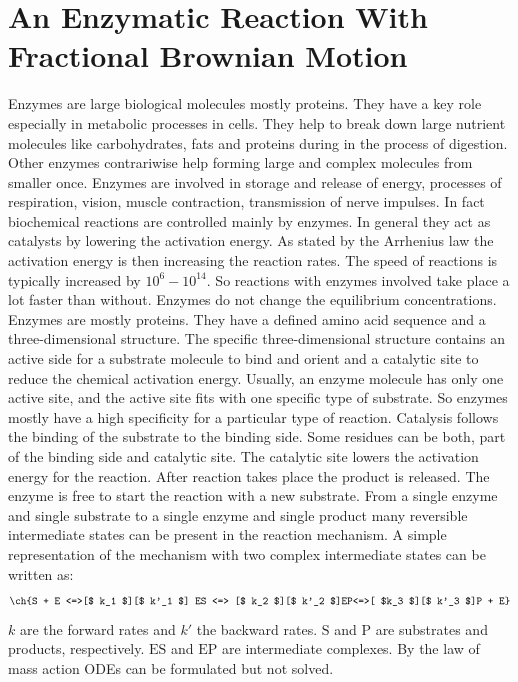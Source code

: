 \documentclass[
  a4paper,BCOR10mm,oneside,
  headsepline,footsepline,%
  fleqn,openbib
]{scrbook}
\begin{document}
\chapter{An Enzymatic Reaction With Fractional Brownian Motion}
Enzymes are large biological molecules mostly proteins. They have a key role especially in metabolic processes in cells. They help to break down large nutrient molecules like carbohydrates, fats and proteins during in the process of digestion. Other enzymes contrariwise help forming large and complex molecules from smaller once. Enzymes are involved in storage and release of energy, processes of respiration, vision, muscle contraction, transmission of nerve impulses. In fact biochemical reactions are controlled mainly by enzymes. In general they act as catalysts by lowering the activation energy. As stated by the Arrhenius law the activation energy is then increasing the reaction rates. The speed of reactions is typically increased by $10^6-10^{14}$. So reactions with enzymes involved take place a lot faster than without. Enzymes do not change the equilibrium concentrations. Enzymes are mostly proteins. They have a defined amino acid sequence and a three-dimensional structure. The specific three-dimensional structure contains an active side for a substrate molecule to bind and orient and a catalytic site to reduce the chemical activation energy. Usually, an enzyme molecule has only one active site, and the active site fits with one specific type of substrate. So enzymes mostly have a high specificity for a particular type of reaction. Catalysis follows the binding of the substrate to the binding side. Some residues can be both, part of the binding side and catalytic site. The catalytic site lowers the activation energy for the reaction. After reaction takes place the product is released. The enzyme is free to start the reaction with a new substrate. From a single enzyme and single substrate to a single enzyme and single product many reversible intermediate states can be present in the reaction mechanism. A simple representation of the mechanism with two complex intermediate states can be written as:
\begin{align} \label{eq:enyzmescheme}
\ch{S + E <=>[$ k_1 $][$ k'_1 $] ES <=> [$ k_2 $][$ k'_2 $]EP<=>[ $k_3 $][$ k'_3 $]P + E}
\end{align}
$k$ are the forward rates and $k'$ the backward rates. $\mathrm{S}$ and $\mathrm{P}$ are substrates and products, respectively. $\mathrm{ES}$ and $\mathrm{EP}$ are intermediate complexes. By the law of mass action ODEs can be formulated but not solved.\par
\end{document}
